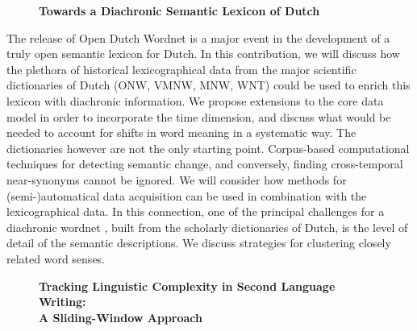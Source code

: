 \documentclass[10pt, a4paper, twopage, headinclude, footinclude, BCOR5mm]{book}
\begin{document}
\newpage

\begin{figure}[t!]
\centering
\large\textbf{Towards a Diachronic Semantic Lexicon of Dutch}
\vspace*{0.5cm}
\end{figure}


\begin{table}[t!]
\end{table} 
\noindent
The release of Open Dutch Wordnet is a major event in the development of a truly open semantic lexicon for Dutch. In this contribution, we will discuss how the plethora of historical lexicographical data from the major scientific dictionaries of Dutch (ONW, VMNW, MNW, WNT) could be used to enrich this lexicon with diachronic information.  We propose extensions to the core data model in order to incorporate the time dimension, and discuss what would be needed to account for shifts in word meaning in a systematic way.  The dictionaries however are not the only starting point. Corpus-based computational techniques for detecting semantic change, and conversely, finding cross-temporal near-synonyms cannot be ignored.  We will consider how methods for (semi-)automatical data acquisition can be used in combination with the lexicographical data. In this connection, one of the principal challenges for a diachronic wordnet , built from the scholarly dictionaries of Dutch, is the level of detail of the semantic descriptions.   We discuss strategies for clustering closely related word senses.   

\newpage

\begin{figure}[t!]
\centering
\large\textbf{Tracking Linguistic Complexity in Second Language Writing: \\ A Sliding-Window Approach}
\vspace*{0.5cm}
\end{figure}
\end{document}
